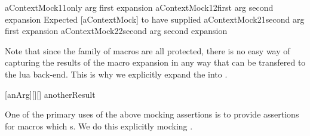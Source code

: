 \skipTestCase

\startConTest
\begingroup
  \assertMockNthArgumentOnMthExpansionMatches%
    {aContextMock}{1}{1}{only arg first expansion}{}
  \assertMockNthArgumentOnMthExpansionMatches%
    {aContextMock}{1}{2}{first arg second expansion}{}
  \startAssertShouldFail{}%
    {Expected [aContextMock] to have supplied}%
    {}
    \assertMockNthArgumentOnMthExpansionMatches%
      {aContextMock}{2}{1}{second arg first expansion}{}
  \stopAssertShouldFail
  \assertMockNthArgumentOnMthExpansionMatches%
    {aContextMock}{2}{2}{second arg second expansion}{}
\endgroup
\stopConTest
\skipTestCase

\stopTestSuite



Note that since the  family of macros are all 
protected, there is no easy way of capturing the results of the macro 
expansion in any way that can be transfered to the lua back-end. This is 
why we explicitly expand the \type{\aContextMock[anArg]} into 
. 


\startConTest
\begingroup
  \assertStringMatches%
    {[anArg][][]}%
    {anotherResult}{}
\endgroup
\stopConTest
\skipTestCase

\stopTestSuite

\startTestSuite[assertErrorThrown]

One of the primary uses of the above mocking assertions is to provide 
assertions for macros which  \type{\errmessage}s. We do this 
explicitly mocking \type{\errmessage}. 

\startMkIVCode
\def\mockErrMessage{%
  \def\errmessage{\relax}
}
\def\assertErrorThrown#1{%
  \assertMockExpanded{errmessage}{#1}
}
\stopMkIVCode


